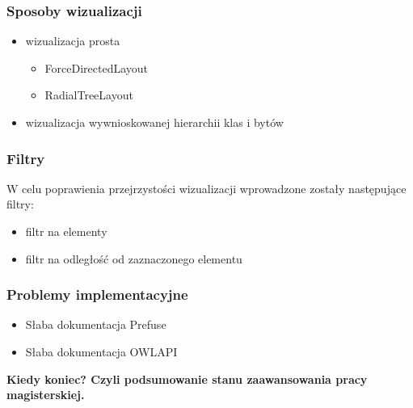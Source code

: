 \documentclass{beamer}
\begin{document}
\begin{frame}
 \frametitle{Sposoby wizualizacji}
\begin{itemize}
 \item wizualizacja prosta
  \begin{itemize}
   \item ForceDirectedLayout
  \item RadialTreeLayout
  \end{itemize}

\item wizualizacja wywnioskowanej hierarchii klas i bytów
\end{itemize}

\end{frame}
\begin{frame}
 \frametitle{Filtry}
  W celu poprawienia przejrzystości wizualizacji wprowadzone zostały następujące filtry:
  \begin{itemize}
   \item filtr na elementy
   \item filtr na odległość od zaznaczonego elementu
  \end{itemize}

\end{frame}

\begin{frame}
 \frametitle{Problemy implementacyjne}

\begin{itemize}
  \item Słaba dokumentacja Prefuse
  \item Słaba dokumentacja OWLAPI 
\end{itemize}



\end{frame}


\begin{frame}
 \begin{center}
  {\bf Kiedy koniec?
\newline  Czyli podsumowanie stanu zaawansowania pracy magisterskiej.}
 \end{center}



\end{frame}
\end{document}
